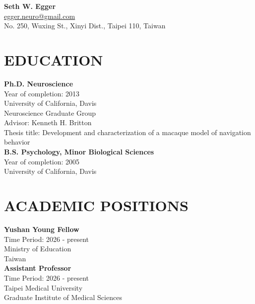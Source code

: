 \documentclass[a4paper,9pt]{extarticle}
\begin{document}
\pagestyle{empty}

\begin{center}
    \textbf{\Large Seth W. Egger }\\[3pt] %
    \href{mailto:egger.neuro@gmail.com}{egger.neuro@gmail.com} \\%
    No. 250, Wuxing St., Xinyi Dist., Taipei 110, Taiwan
\end{center}

\section*{EDUCATION}
    \noindent
    \newline
    \textbf{Ph.D. Neuroscience} \\
    Year of completion: 2013\\ 
    University of California, Davis \\ 
    Neuroscience Graduate Group \\
    Advisor: Kenneth H. Britton \\
    Thesis title: Development and characterization of a macaque model of navigation behavior \\

    \noindent
    \textbf{B.S. Psychology, Minor Biological Sciences} \\
    Year of completion: 2005\\ 
    University of California, Davis \\ 
    

\section*{ACADEMIC POSITIONS}
    \noindent
    \textbf{Yushan Young Fellow} \\
    Time Period: 2026 - present\\
    Ministry of Education \\ 
    Taiwan \\

    \noindent
    \textbf{Assistant Professor} \\
    Time Period: 2026 - present\\
    Taipei Medical University \\ 
    Graduate Institute of Medical Sciences \\
\end{document}
